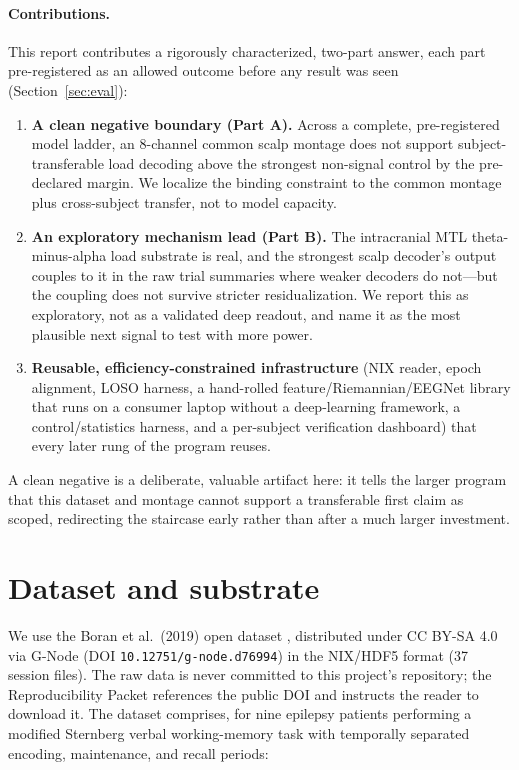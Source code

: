 \documentclass[11pt]{article}
\begin{document}
\paragraph{Contributions.} This report contributes a rigorously characterized, two-part answer,
each part pre-registered as an allowed outcome before any result was seen
(Section~\ref{sec:eval}):
\begin{enumerate}[nosep]
  \item \textbf{A clean negative boundary (Part A).} Across a complete, pre-registered model
  ladder, an 8-channel common scalp montage does not support subject-transferable load decoding
  above the strongest non-signal control by the pre-declared margin. We localize the binding
  constraint to the common montage plus cross-subject transfer, not to model capacity.
  \item \textbf{An exploratory mechanism lead (Part B).} The intracranial MTL theta-minus-alpha
  load substrate is real, and the strongest scalp decoder's output couples to it in the raw trial
  summaries where weaker decoders do not---but the coupling does not survive stricter
  residualization. We report this as exploratory, not as a validated deep readout, and name it as
  the most plausible next signal to test with more power.
  \item \textbf{Reusable, efficiency-constrained infrastructure} (NIX reader, epoch alignment,
  LOSO harness, a hand-rolled feature/Riemannian/EEGNet library that runs on a consumer laptop
  without a deep-learning framework, a control/statistics harness, and a per-subject verification
  dashboard) that every later rung of the program reuses.
\end{enumerate}

A clean negative is a deliberate, valuable artifact here: it tells the larger program that this
dataset and montage cannot support a transferable first claim as scoped, redirecting the staircase
early rather than after a much larger investment.

\section{Dataset and substrate}
\label{sec:data}

We use the Boran et al.\ (2019) open dataset \cite{boran2019dataset,boran2020descriptor}, distributed under CC BY-SA
4.0 via G-Node (DOI \texttt{10.12751/g-node.d76994}) in the NIX/HDF5 format
(37 session files). The raw data is never committed to this project's repository; the
Reproducibility Packet references the public DOI and instructs the reader to download it. The
dataset comprises, for nine epilepsy patients performing a modified Sternberg verbal
working-memory task with temporally separated encoding, maintenance, and recall periods:
\end{document}

